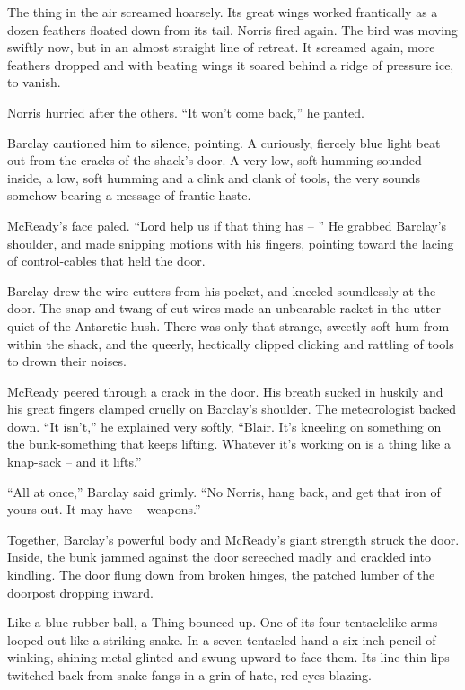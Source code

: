 \documentclass[ebook,oneside,11pt]{memoir}				%
\begin{document}
The thing in the air screamed hoarsely. Its great wings worked frantically as a dozen feathers floated down from its tail. Norris fired again. The bird was moving swiftly now, but in an almost straight line of retreat. It screamed again, more feathers dropped and with beating wings it soared behind a ridge of pressure ice, to vanish.

Norris hurried after the others. ``It won't come back,'' he panted.

Barclay cautioned him to silence, pointing. A curiously, fiercely blue light beat out from the cracks of the shack's door. A very low, soft humming sounded inside, a low, soft humming and a clink and clank of tools, the very sounds somehow bearing a message of frantic haste.

McReady's face paled. ``Lord help us if that thing has -- '' He grabbed Barclay's shoulder, and made snipping motions with his fingers, pointing toward the lacing of control-cables that held the door.

Barclay drew the wire-cutters from his pocket, and kneeled soundlessly at the door. The snap and twang of cut wires made an unbearable racket in the utter quiet of the Antarctic hush. There was only that strange, sweetly soft hum from within the shack, and the queerly, hectically clipped clicking and rattling of tools to drown their noises.

McReady peered through a crack in the door. His breath sucked in huskily and his great fingers clamped cruelly on Barclay's shoulder. The meteorologist backed down. ``It isn't,'' he explained very softly, ``Blair. It's kneeling on something on the bunk-something that keeps lifting. Whatever it's working on is a thing like a knap-sack -- and it lifts.''

``All at once,'' Barclay said grimly. ``No Norris, hang back, and get that iron of yours out. It may have -- weapons.''

Together, Barclay's powerful body and McReady's giant strength struck the door. Inside, the bunk jammed against the door screeched madly and crackled into kindling. The door flung down from broken hinges, the patched lumber of the doorpost dropping inward.

Like a blue-rubber ball, a Thing bounced up. One of its four tentaclelike arms looped out like a striking snake. In a seven-tentacled hand a six-inch pencil of winking, shining metal glinted and swung upward to face them. Its line-thin lips twitched back from snake-fangs in a grin of hate, red eyes blazing.
\end{document}
